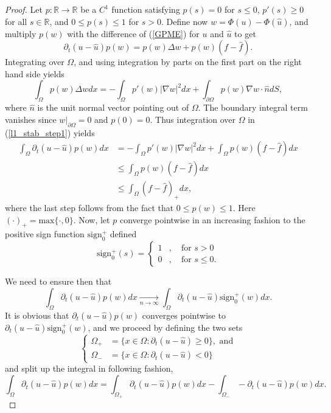 \documentclass[11pt, a4paper]{article}
\begin{document}
\begin{proof}
Let $p: \mathbb{R} \to \mathbb{R}$ be a $C^1$ function satisfying $p(s) = 0$ for $s \leq 0$, $p'(s) \geq 0$ for all $s\in \mathbb{R}$, and $0 \leq p(s) \leq 1$ for $s > 0$. Define now $w = \Phi(u) - \Phi(\hat{u})$, and multiply $p(w)$ with the difference of (\ref{GPME}) for $u$ and $\hat{u}$ to get
\begin{equation}
\label{l1_stab_step1}
\partial_t(u-\hat{u})p(w) = p(w)\Delta w + p(w)(f-\hat{f}).
\end{equation}
Integrating over $\Omega$, and using integration by parts on the first part on the right hand side yields
\begin{equation*}
\int_\Omega p(w)\Delta w dx = -\int_\Omega p'(w)|\nabla w|^2dx + \int_{\partial \Omega}p(w)\nabla w \cdot \hat{n} dS,
\end{equation*}
where $\hat{n}$ is the unit normal vector pointing out of $\Omega$. The boundary integral term vanishes since $w\big|_{\partial \Omega} = 0$ and $p(0)=0$. Thus integration over $\Omega$ in (\ref{l1_stab_step1}) yields 
\begin{align*}
\int_{\Omega}\partial_t(u-\hat{u})p(w)dx &= -\int_{\Omega}p'(w)|\nabla w|^2dx + \int_{\Omega}p(w)(f-\hat{f}) dx \\
	&\leq \int_{\Omega}p(w)(f-\hat{f}) dx \\
	&\leq \int_{\Omega}(f-\hat{f})_+ dx,
\end{align*}
where the last step follows from the fact that $0 \leq p(w) \leq 1$. Here $(\cdot)_+ = \mathrm{max}\{\cdot, 0\}$.
Now, let $p$ converge pointwise in an increasing fashion to the positive sign function $\mathrm{sign}_0^+$ defined
\begin{equation*}
\mathrm{sign}^+_0(s) = \begin{cases}
1&, \quad \text{for } s>0 \\
0&, \quad \text{for } s\leq 0.
\end{cases}
\end{equation*}

We need to ensure then that
\begin{equation}
\label{cool_use_of_MCT}
\int_\Omega \partial_t (u - \hat{u}) p(w) dx \underset{n \to \infty}{\to} \int_\Omega \partial_t (u - \hat{u})\mathrm{sign}^+_0(w)dx.
\end{equation}
It is obvious that $\partial_t (u - \hat{u})p(w)$ converges pointwise to $\partial_t (u-\hat{u})\mathrm{sign}_0^+(w)$, and we proceed by defining the two sets
\begin{equation*}
\begin{cases}
\Omega_+ &= \{ x \in \Omega: \partial_t (u - \hat{u}) \geq 0 \}, \text{ and} \\
\Omega_- &=  \{ x \in \Omega: \partial_t (u - \hat{u}) < 0\} 
\end{cases}
\end{equation*}
and split up the integral in following fashion,
\begin{equation}
\int_\Omega \partial_t (u - \hat{u}) p(w) dx = \int_{\Omega_+}\partial_t (u - \hat{u}) p(w)dx - \int_{\Omega_-} -\partial_t (u - \hat{u}) p(w)dx. 
\end{equation}


\end{proof}
\end{document}
